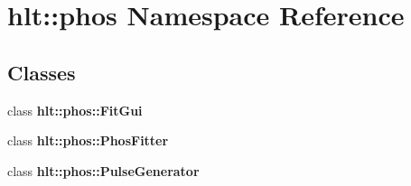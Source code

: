 \section{hlt::phos Namespace Reference}
\label{namespacehlt_1_1phos}


\subsection*{Classes}
\begin{CompactItemize}
\item 
class {\bf hlt::phos::Fit\-Gui}
\item 
class {\bf hlt::phos::Phos\-Fitter}
\item 
class {\bf hlt::phos::Pulse\-Generator}
\end{CompactItemize}
